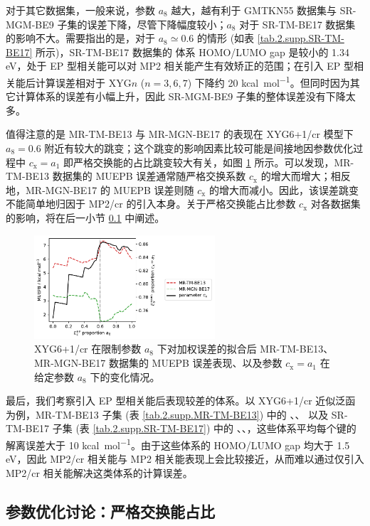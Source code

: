 对于其它数据集，一般来说，参数 $a_8$ 越大，越有利于 GMTKN55 数据集与 SR-MGM-BE9 子集的误差下降，尽管下降幅度较小；$a_8$ 对于 SR-TM-BE17 数据集的影响不大。需要指出的是，对于 $a_8 \simeq 0.6$ 的情形 (如表 \ref{tab.2.supp.SR-TM-BE17} 所示)，SR-TM-BE17 数据集的  体系 HOMO/LUMO gap 是较小的 1.34 eV，处于 EP 型相关能可以对 MP2 相关能产生有效矫正的范围；在引入 EP 型相关能后计算误差相对于 XYG$n$ ($n=3,6,7$) 下降约 20 \si{kcal.mol^{-1}}。但同时因为其它计算体系的误差有小幅上升，因此 SR-MGM-BE9 子集的整体误差没有下降太多。

值得注意的是 MR-TM-BE13 与 MR-MGN-BE17 的表现在 XYG6+1/cr 模型下 $a_8 = 0.6$ 附近有较大的跳变；这个跳变的影响因素比较可能是间接地因参数优化过程中 $c_\mathrm{x} = a_1$ 即严格交换能的占比跳变较大有关，如图 \ref{fig.2.plot-seq-cr-against-cx} 所示。可以发现，MR-TM-BE13 数据集的 MUEPB 误差通常随严格交换系数 $c_\mathrm{x}$ 的增大而增大；相反地，MR-MGN-BE17 的 MUEPB 误差则随 $c_\mathrm{x}$ 的增大而减小。因此，该误差跳变不能简单地归因于 MP2/cr 的引入本身。关于严格交换能占比参数 $c_\mathrm{x}$ 对各数据集的影响，将在后一小节 \ref{sec.2.proportion-exchange} 中阐述。

\begin{figure}[h]
  \centering
  \includegraphics[width=0.6\textwidth]{assets/plot-seq-cr-against-cx.pdf}
  \caption{XYG6+1/cr 在限制参数 $a_8$ 下对加权误差的拟合后 MR-TM-BE13、MR-MGN-BE17 数据集的 MUEPB 误差表现、以及参数 $c_\mathrm{x} = a_1$ 在给定参数 $a_8$ 下的变化情况。}
  \label{fig.2.plot-seq-cr-against-cx}
\end{figure}

最后，我们考察引入 EP 型相关能后表现较差的体系。以 XYG6+1/cr 近似泛函为例，MR-TM-BE13 子集 (表 \ref{tab.2.supp.MR-TM-BE13}) 中的 、、 以及 SR-TM-BE17 子集 (表 \ref{tab.2.supp.SR-TM-BE17}) 中的 、、，这些体系平均每个键的解离误差大于 10 \si{kcal.mol^{-1}}。由于这些体系的 HOMO/LUMO gap 均大于 1.5 eV，因此 MP2/cr 相关能与 MP2 相关能表现上会比较接近，从而难以通过仅引入 MP2/cr 相关能解决这类体系的计算误差。

\subsection{参数优化讨论：严格交换能占比}
\label{sec.2.proportion-exchange}

